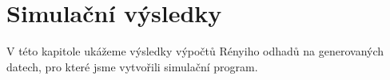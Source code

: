 \chapter{Simulační výsledky}

\noindent V této kapitole ukážeme výsledky výpočtů Rényiho odhadů na generovaných datech, pro které jsme vytvořili simulační program. 

